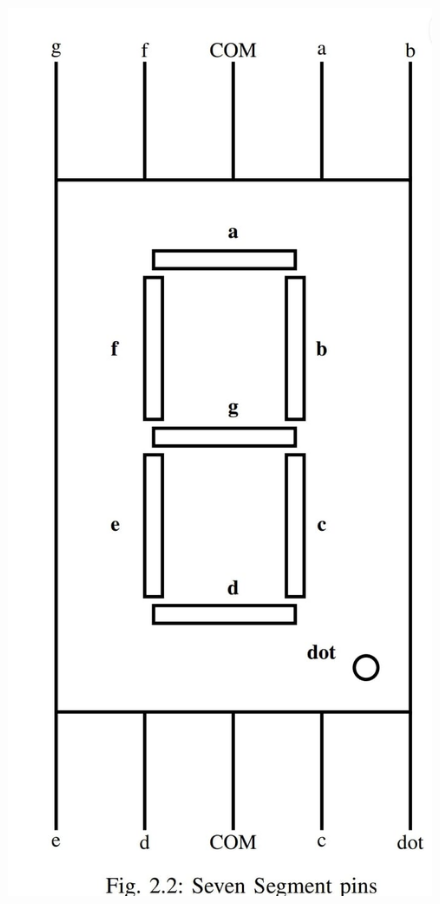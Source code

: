 \documentclass[a4paper,12pt]{article}
\begin{document}
\begin{figure}[h]
\begin{minipage}{0.48\textwidth}
        \includegraphics[width=\textwidth]{figs/seven_segment.jpeg}
    \end{minipage}
\end{figure}
\newpage
\end{document}
